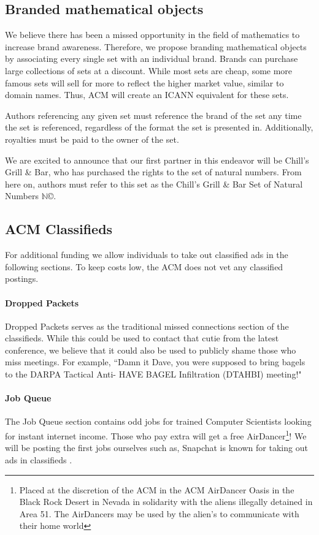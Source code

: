 \subsection{Branded mathematical objects}
We believe there has been a missed opportunity in the field of mathematics to
increase brand awareness.
Therefore, we propose branding mathematical objects by associating every single
set with an individual brand.
Brands can purchase large collections of sets at a discount.
While most sets are cheap, some more famous sets will sell for more to reflect
the higher market value, similar to domain names.
Thus, ACM will create an ICANN equivalent for these sets.

Authors referencing any given set must reference the brand of the set any time
the set is referenced, regardless of the format the set is presented  in.
Additionally, royalties must be paid to the owner of the set.

We are excited to announce that our first partner in this endeavor will be
Chill's Grill \& Bar, who has purchased the rights to the set of natural
numbers.
From here on, authors must refer to this set as the Chill's Grill \& Bar Set of
Natural Numbers \(\mathbb{N}\)\copyright.

\subsection{ACM Classifieds}
For additional funding we allow individuals to take out classified ads in the
following sections.
To keep costs low, the ACM does not vet any classified postings.

\paragraph{Dropped Packets}
Dropped Packets serves as the traditional missed connections section of the
classifieds.
While this could be used to contact that cutie  from the latest
conference, we believe that it could also be used to publicly shame those who
miss meetings.
For example, ``Damn it Dave, you were supposed to bring bagels to the DARPA
Tactical Anti- HAVE BAGEL Infiltration 
(DTAHBI) meeting!"

\paragraph{Job Queue}
The Job Queue section contains odd jobs for trained Computer Scientists looking
for instant internet income.
Those who pay extra will get a free AirDancer\footnote{Placed at the discretion
of the ACM in the ACM AirDancer Oasis in the Black Rock Desert in Nevada in
solidarity with the aliens illegally detained in Area 51.  The AirDancers may
be used by the alien's to communicate with their home world}!
We will be posting the first jobs ourselves such as,
Snapchat is known for taking out ads in classifieds .

